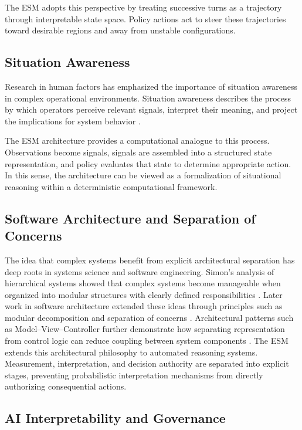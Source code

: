 \documentclass[11pt]{article}
\begin{document}
The ESM adopts this perspective by treating successive turns as a trajectory through interpretable state space. Policy actions act to steer these trajectories toward desirable regions and away from unstable configurations.

\subsection{Situation Awareness}

Research in human factors has emphasized the importance of situation awareness in complex operational environments. Situation awareness describes the process by which operators perceive relevant signals, interpret their meaning, and project the implications for system behavior \citep{endsley1995}.

The ESM architecture provides a computational analogue to this process. Observations become signals, signals are assembled into a structured state representation, and policy evaluates that state to determine appropriate action. In this sense, the architecture can be viewed as a formalization of situational reasoning within a deterministic computational framework.

\subsection{Software Architecture and Separation of Concerns}

The idea that complex systems benefit from explicit architectural separation has deep roots in systems science and software engineering. Simon's analysis of hierarchical systems showed that complex systems become manageable when organized into modular structures with clearly defined responsibilities \citep{simon1962}. Later work in software architecture extended these ideas through principles such as modular decomposition and separation of concerns \citep{parnas1972,dijkstra1974}. Architectural patterns such as Model–View–Controller further demonstrate how separating representation from control logic can reduce coupling between system components \citep{reenskaug1979}.
The ESM extends this architectural philosophy to automated reasoning systems. Measurement, interpretation, and decision authority are separated into explicit stages, preventing probabilistic interpretation mechanisms from directly authorizing consequential actions.

\subsection{AI Interpretability and Governance}
\end{document}

